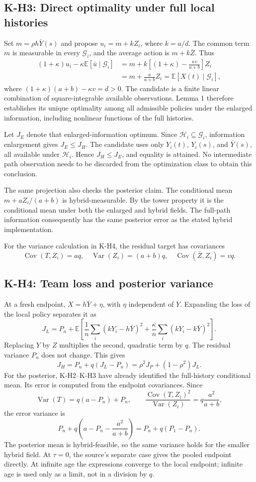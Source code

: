 \documentclass[11pt,letterpaper]{article}
\newcommand{\E}{\mathbb E}
\newcommand{\Var}{\operatorname{Var}}
\newcommand{\Cov}{\operatorname{Cov}}
\newcommand{\G}{\mathcal G}
\newcommand{\HH}{\mathcal H}
\newcommand{\calculation}[2]{\subsection{#1: #2}}
\begin{document}
\calculation{K-H3}{Direct optimality under full local histories}
Set $m=\rho h\bar Y(s)$ and propose $u_i=m+kZ_i$, where $k=a/d$. The common term $m$ is measurable in every $\G_i$, and the average action is $m+k\bar Z$. Thus
\begin{align*}
(1+\kappa)u_i-\kappa\E[\bar u\mid\G_i]
&=m+k\left[(1+\kappa)-\frac{\kappa v}{a+b}\right]Z_i\\
&=m+\frac{a}{a+b}Z_i
=\E[X(t)\mid\G_i],
\end{align*}
where $(1+\kappa)(a+b)-\kappa v=d>0$. The candidate is a finite linear combination of square-integrable available observations. Lemma 1 therefore establishes its unique optimality among all admissible policies under the enlarged information, including nonlinear functions of the full histories.

Let $J_E$ denote that enlarged-information optimum. Since $\HH_i\subseteq\G_i$, information enlargement gives $J_E\le J_H$. The candidate uses only $Y_i(t)$, $Y_i(s)$, and $\bar Y(s)$, all available under $\HH_i$. Hence $J_H\le J_E$, and equality is attained. No intermediate path observation needs to be discarded from the optimization class to obtain this conclusion.

The same projection also checks the posterior claim. The conditional mean $m+aZ_i/(a+b)$ is hybrid-measurable. By the tower property it is the conditional mean under both the enlarged and hybrid fields. The full-path information consequently has the same posterior error as the stated hybrid implementation.

For the variance calculation in K-H4, the residual target has covariances
\[
\Cov(T,Z_i)=a q,\quad
\Var(Z_i)=(a+b)q,\quad
\Cov(\bar Z,Z_i)=vq.
\]

\calculation{K-H4}{Team loss and posterior variance}
At a fresh endpoint, $X=h\bar Y+\eta$, with $\eta$ independent of $Y$. Expanding the loss of the local policy separates it as
\[
J_L=P_n+
\E\left[\frac1n\sum_i(kY_i-h\bar Y)^2+
\frac\kappa n\sum_i(kY_i-k\bar Y)^2\right].
\]
Replacing $Y$ by $Z$ multiplies the second, quadratic term by $q$. The residual variance $P_n$ does not change. This gives
\[
J_H=P_n+q(J_L-P_n)=\rho^2J_P+(1-\rho^2)J_L.
\]
For the posterior, K-H2--K-H3 have already identified the full-history conditional mean. Its error is computed from the endpoint covariances. Since
\[
\Var(T)=q(a-P_n)+P_n,\qquad
\frac{\Cov(T,Z_i)^2}{\Var(Z_i)}=q\frac{a^2}{a+b},
\]
the error variance is
\[
P_n+q\left(a-P_n-\frac{a^2}{a+b}\right)
=P_n+q(P_1-P_n).
\]
The posterior mean is hybrid-feasible, so the same variance holds for the smaller hybrid field. At $\tau=0$, the source's separate case gives the pooled endpoint directly. At infinite age the expressions converge to the local endpoint; infinite age is used only as a limit, not in a division by $q$.
\end{document}
